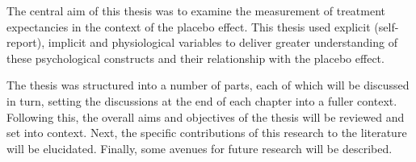 



The central aim of this thesis was to examine the measurement of
treatment expectancies in the context of the placebo effect. This
thesis used explicit (self-report), implicit and physiological
variables to deliver greater understanding of these psychological
constructs and their relationship with the placebo effect.


The thesis was structured into a number of parts, each of which will
be discussed in turn, setting the discussions at the end of each
chapter into a fuller context. Following this, the overall aims and
objectives of the thesis will be reviewed and set into context. Next, the specific contributions of this research to the literature will be elucidated. 
Finally, some avenues for future research will be described.

